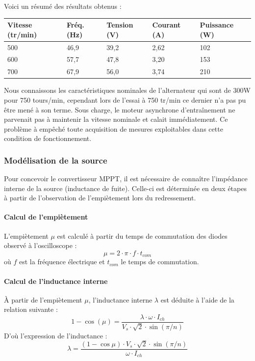 Voici un résumé des résultats obtenus :

\begin{tableau}[H]
    \centering
    \begin{tabularx}{\textwidth}{X X X X X}
        \toprule
        \textbf{Vitesse (tr/min)} & \textbf{Fréq. (Hz)} & \textbf{Tension (V)} & \textbf{Courant (A)} & \textbf{Puissance (W)} \\
        \midrule
        500 & 46,9 & 39,2 & 2,62 & 102 \\
        600 & 57,7 & 47,8 & 3,20 & 153 \\
        700 & 67,9 & 56,0 & 3,74 & 210 \\
        \bottomrule
    \end{tabularx}
    \caption{Caractéristiques en charge après redressement.}
    \label{tab:recap_charge}
\end{tableau}

Nous connaissons les caractéristiques  nominales de l’alternateur qui sont de 300W pour 750 tours/min, cependant lors de l’essai à 750 tr/min ce dernier n’a pas pu être mené à son terme. Sous charge, le moteur asynchrone d’entraînement ne parvenait pas à maintenir la vitesse nominale et calait immédiatement. Ce problème à empêché toute acquisition de mesures exploitables dans cette condition de fonctionnement.

\subsubsection{Modélisation de la source}
Pour concevoir le convertisseur MPPT, il est nécessaire de connaître l'impédance interne de la source (inductance de fuite). Celle-ci est déterminée en deux étapes à partir de l'observation de l'empiètement lors du redressement.

\paragraph{Calcul de l'empiètement}
L'empiètement $\mu$ est calculé à partir du temps de commutation des diodes observé à l'oscilloscope :
\begin{equation*}
    \mu = 2 \cdot \pi \cdot f \cdot t_{com}
\end{equation*}
où $f$ est la fréquence électrique et $t_{com}$ le temps de commutation.

\paragraph{Calcul de l'inductance interne}
À partir de l'empiètement $\mu$, l'inductance interne $\lambda$ est déduite à l'aide de la relation suivante :
\begin{equation*}
    1 - \cos(\mu) = \frac{\lambda \cdot \omega \cdot I_{ch}}{V_s \cdot \sqrt{2} \cdot \sin(\pi/n)}
\end{equation*}
D'où l'expression de l'inductance :
\begin{equation*}
    \lambda = \frac{(1 - \cos\mu) \cdot V_s \cdot \sqrt{2} \cdot \sin(\pi/n)}{\omega \cdot I_{ch}}
\end{equation*}

